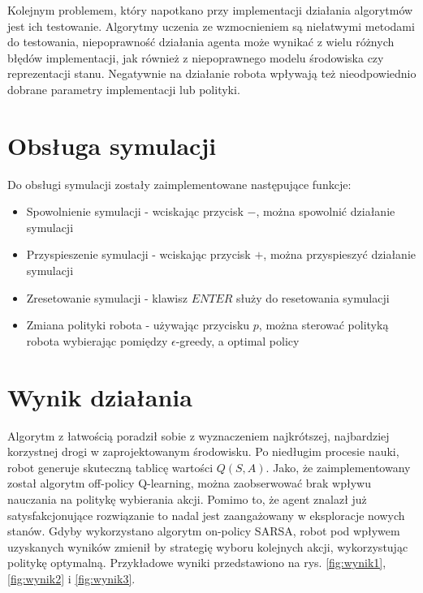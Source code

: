 Kolejnym problemem, który napotkano przy implementacji działania algorytmów jest ich testowanie. Algorytmy uczenia ze 
wzmocnieniem są niełatwymi metodami do testowania, niepoprawność działania agenta może wynikać z wielu różnych błędów 
implementacji, jak również z niepoprawnego modelu środowiska czy reprezentacji stanu. Negatywnie na 
działanie robota wpływają też nieodpowiednio dobrane parametry implementacji lub polityki.

\section{Obsługa symulacji}

Do obsługi symulacji zostały zaimplementowane następujące funkcje:
\begin{itemize}
 \item Spowolnienie symulacji - wciskając przycisk $-$, można spowolnić działanie symulacji
 \item Przyspieszenie symulacji - wciskając przycisk $+$, można przyspieszyć działanie symulacji
 \item Zresetowanie symulacji - klawisz $ENTER$ służy do resetowania symulacji
 \item Zmiana polityki robota - używając przycisku $p$, można sterować polityką robota wybierając pomiędzy 
$\epsilon$-greedy, a optimal policy
\end{itemize}


\section{Wynik działania}
\label{sec:wynikdzialania}

Algorytm z łatwością poradził sobie z wyznaczeniem najkrótszej, najbardziej korzystnej drogi w 
zaprojektowanym środowisku. Po niedługim procesie nauki, robot generuje skuteczną tablicę wartości $Q(S, A)$.
Jako, że zaimplementowany został algorytm off-policy Q-learning, można zaobserwować brak wpływu nauczania na politykę 
wybierania akcji. Pomimo to, że agent znalazł już satysfakcjonujące rozwiązanie to nadal jest zaangażowany w eksploracje 
nowych stanów. Gdyby wykorzystano algorytm on-policy SARSA, robot pod wpływem uzyskanych wyników zmienił by strategię 
wyboru kolejnych akcji, wykorzystując politykę optymalną. Przykładowe wyniki przedstawiono na rys. \ref{fig:wynik1}, 
\ref{fig:wynik2} i \ref{fig:wynik3}.

